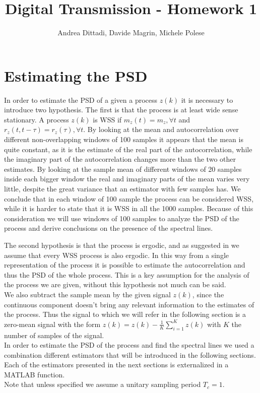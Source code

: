 \documentclass[10pt]{article}
\begin{document}
\title{Digital Transmission - Homework 1}
\author{Andrea Dittadi, Davide Magrin, Michele Polese}

\maketitle

\section{Estimating the PSD}
In order to estimate the PSD of a given a process $z(k)$ it is necessary to introduce two hypothesis. The first is that the process is at least wide sense stationary. A process $z(k)$ is WSS if $m_z(t) = m_z, \forall t$ and $r_z(t, t - \tau) = r_z(\tau), \forall t$. By looking at the mean and autocorrelation over different non-overlapping windows of 100 samples it appears that the mean is quite constant, as it is the estimate of the real part of the autocorrelation, while the imaginary part of the autocorrelation changes more than the two other estimates. By looking at the sample mean of different windows of 20 samples inside each bigger window the real and imaginary parts of the mean varies very little, despite the great variance that an estimator with few samples has. We conclude that in each window of 100 sample the process can be considered WSS, while it is harder to state that it is WSS in all the 1000 samples. Because of this consideration we will use windows of 100 samples to analyze the PSD of the process and derive conclusions on the presence of the spectral lines.



The second hypothesis is that the process is ergodic, and as suggested in \cite{bc} we assume that every WSS process is also ergodic. In this way from a single representation of the process it is possible to estimate the autocorrelation and thus the PSD of the whole process. This is a key assumption for the analysis of the process we are given, without this hypothesis not much can be said. \\
We also subtract the sample mean by the given signal $z(k)$, since the continuous component doesn't bring any relevant information to the estimates of the process. Thus the signal to which we will refer in the following section is a zero-mean signal with the form $z(k) = z(k) - \frac{1}{K} \sum_{i=1}^K z(k)$ with $K$ the number of samples of the signal. \\
In order to estimate the PSD of the process and find the spectral lines we used a combination different estimators that will be introduced in the following sections. Each of the estimators presented in the next sections is externalized in a MATLAB function.\\
Note that unless specified we assume a unitary sampling period $T_c = 1$.
\end{document}
